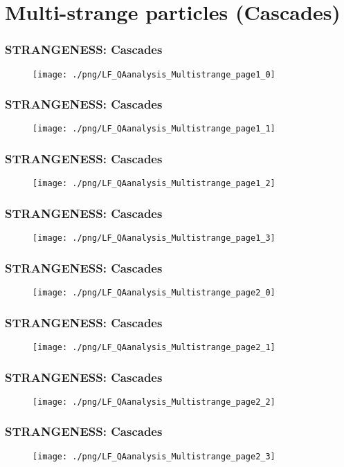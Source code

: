 \documentclass{beamer}
\begin{document}
\section{Multi-strange particles (Cascades)}
\begin{frame}
\frametitle{STRANGENESS: Cascades}
  \begin{figure}
  \texttt{[image: ./png/LF\_QAanalysis\_Multistrange\_page1\_0]}
  \end{figure}
\end{frame}
\begin{frame}
\frametitle{STRANGENESS: Cascades}
  \begin{figure}
  \texttt{[image: ./png/LF\_QAanalysis\_Multistrange\_page1\_1]}
  \end{figure}
\end{frame}
\begin{frame}
\frametitle{STRANGENESS: Cascades}
  \begin{figure}
  \texttt{[image: ./png/LF\_QAanalysis\_Multistrange\_page1\_2]}
  \end{figure}
\end{frame}
\begin{frame}
\frametitle{STRANGENESS: Cascades}
  \begin{figure}
  \texttt{[image: ./png/LF\_QAanalysis\_Multistrange\_page1\_3]}
  \end{figure}
\end{frame}
\begin{frame}
\frametitle{STRANGENESS: Cascades}
  \begin{figure}
  \texttt{[image: ./png/LF\_QAanalysis\_Multistrange\_page2\_0]}
  \end{figure}
\end{frame}
\begin{frame}
\frametitle{STRANGENESS: Cascades}
  \begin{figure}
  \texttt{[image: ./png/LF\_QAanalysis\_Multistrange\_page2\_1]}
  \end{figure}
\end{frame}
\begin{frame}
\frametitle{STRANGENESS: Cascades}
  \begin{figure}
  \texttt{[image: ./png/LF\_QAanalysis\_Multistrange\_page2\_2]}
  \end{figure}
\end{frame}
\begin{frame}
\frametitle{STRANGENESS: Cascades}
  \begin{figure}
  \texttt{[image: ./png/LF\_QAanalysis\_Multistrange\_page2\_3]}
  \end{figure}
\end{frame}
\end{document}
